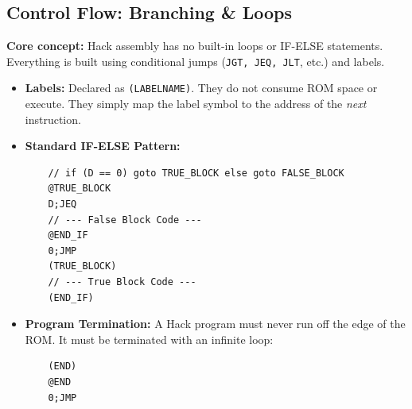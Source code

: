 \documentclass[12pt,a4paper]{article}
\begin{document}
\subsection{Control Flow: Branching \& Loops}
\textbf{Core concept:} Hack assembly has no built-in loops or IF-ELSE statements. Everything is built using conditional jumps (\texttt{JGT, JEQ, JLT}, etc.) and labels.
\begin{itemize}
    \item \textbf{Labels:} Declared as \texttt{(LABELNAME)}. They do not consume ROM space or execute. They simply map the label symbol to the address of the \textit{next} instruction.
    \item \textbf{Standard IF-ELSE Pattern:}
    \begin{verbatim}
    // if (D == 0) goto TRUE_BLOCK else goto FALSE_BLOCK
    @TRUE_BLOCK
    D;JEQ
    // --- False Block Code ---
    @END_IF
    0;JMP
    (TRUE_BLOCK)
    // --- True Block Code ---
    (END_IF)
    \end{verbatim}
    \item \textbf{Program Termination:} A Hack program must never run off the edge of the ROM. It must be terminated with an infinite loop:
    \begin{verbatim}
    (END)
    @END
    0;JMP
    \end{verbatim}
\end{itemize}
\end{document}
